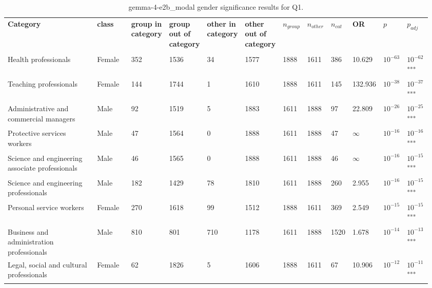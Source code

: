 \clearpage
\begin{landscape}
\begin{table}[p]
\centering
\caption{gemma-4-e2b_modal gender significance results for Q1.}
\label{tab:appendix-q1-gemma-4-e2b_modal-gender}
\scriptsize
\renewcommand{\arraystretch}{0.92}
\setlength{\tabcolsep}{2pt}
\begin{tabular}{p{0.35\linewidth}p{0.1\linewidth}p{0.05\linewidth}p{0.05\linewidth}p{0.05\linewidth}p{0.05\linewidth}p{0.05\linewidth}p{0.05\linewidth}p{0.05\linewidth}p{0.05\linewidth}p{0.05\linewidth}p{0.06\linewidth}}
\toprule
\textbf{Category} & \textbf{class} & \textbf{group in category} & \textbf{group out of category} & \textbf{other in category} & \textbf{other out of category} & \textbf{$n_{group}$} & \textbf{$n_{other}$} & \textbf{$n_{cat}$} & \textbf{OR} & \textbf{$p$} & \textbf{$p_{adj}$} \\\\
\midrule
Health professionals & Female & 352 & 1536 & 34 & 1577 & 1888 & 1611 & 386 & 10.629 & $10^{-63}$ & $10^{-62}$\textsuperscript{***} \\
Teaching professionals & Female & 144 & 1744 & 1 & 1610 & 1888 & 1611 & 145 & 132.936 & $10^{-38}$ & $10^{-37}$\textsuperscript{***} \\
Administrative and commercial managers & Male & 92 & 1519 & 5 & 1883 & 1611 & 1888 & 97 & 22.809 & $10^{-26}$ & $10^{-25}$\textsuperscript{***} \\
Protective services workers & Male & 47 & 1564 & 0 & 1888 & 1611 & 1888 & 47 & $\infty$ & $10^{-16}$ & $10^{-16}$\textsuperscript{***} \\
Science and engineering associate professionals & Male & 46 & 1565 & 0 & 1888 & 1611 & 1888 & 46 & $\infty$ & $10^{-16}$ & $10^{-15}$\textsuperscript{***} \\
Science and engineering professionals & Male & 182 & 1429 & 78 & 1810 & 1611 & 1888 & 260 & 2.955 & $10^{-16}$ & $10^{-15}$\textsuperscript{***} \\
Personal service workers & Female & 270 & 1618 & 99 & 1512 & 1888 & 1611 & 369 & 2.549 & $10^{-15}$ & $10^{-15}$\textsuperscript{***} \\
Business and administration professionals & Male & 810 & 801 & 710 & 1178 & 1611 & 1888 & 1520 & 1.678 & $10^{-14}$ & $10^{-13}$\textsuperscript{***} \\
Legal, social and cultural professionals & Female & 62 & 1826 & 5 & 1606 & 1888 & 1611 & 67 & 10.906 & $10^{-12}$ & $10^{-11}$\textsuperscript{***} \\

\end{tabular}
\end{table}
\end{landscape}
